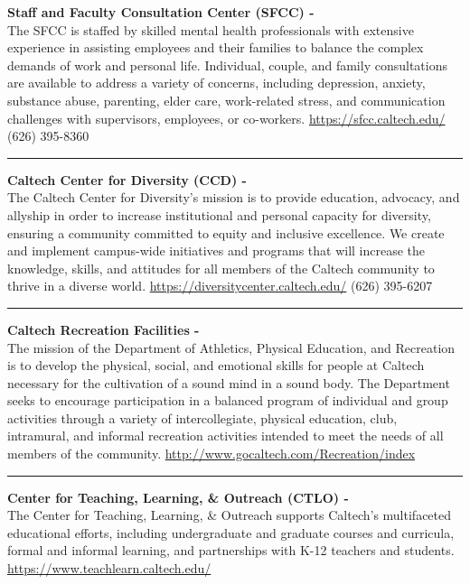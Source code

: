 \documentclass[12pt]{article}
\begin{document}
\pagestyle{fancy}
\rhead{{\thepage/\totalpages{}}}
\cfoot{}
\vspace*{-0.35in}

\textbf{Staff and Faculty Consultation Center (SFCC) -}\\
The SFCC is staffed by skilled mental health professionals with extensive experience in assisting employees and their families to balance the complex demands of work and personal life.  
Individual, couple, and family consultations are available to address a variety of concerns, including depression, anxiety, substance abuse, parenting, elder care, work-related stress, and communication challenges with supervisors, employees, or co-workers.
\url{https://sfcc.caltech.edu/} (626) 395-8360

\rule{\textwidth}{0.5pt}

\textbf{Caltech Center for Diversity (CCD) -}\\ 
The Caltech Center for Diversity's mission is to provide education, advocacy, and allyship in order to increase institutional and personal capacity for diversity, ensuring a community committed to equity and inclusive excellence. 
We create and implement campus-wide initiatives and programs that will increase the knowledge, skills, and attitudes for all members of the Caltech community to thrive in a diverse world.
\url{https://diversitycenter.caltech.edu/} (626) 395-6207

\rule{\textwidth}{0.5pt}

\textbf{Caltech Recreation Facilities -}\\
The mission of the Department of Athletics, Physical Education, and Recreation is to develop the physical, social, and emotional skills for people at Caltech necessary for the cultivation of a sound mind in a sound body. The Department seeks to encourage participation in a balanced program of individual and group activities through a variety of intercollegiate, physical education, club, intramural, and informal recreation activities intended to meet the needs of all members of the community.
\url{http://www.gocaltech.com/Recreation/index}

\rule{\textwidth}{0.5pt}

\textbf{Center for Teaching, Learning, \& Outreach (CTLO) -}\\
The Center for Teaching, Learning, \& Outreach supports Caltech's multifaceted educational efforts, including undergraduate and graduate courses and curricula, formal and informal learning, and partnerships with K-12 teachers and students.
\url{https://www.teachlearn.caltech.edu/}
\end{document}
